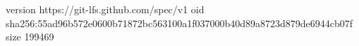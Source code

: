 version https://git-lfs.github.com/spec/v1
oid sha256:55ad96b572e0600b71872bc563100a1f037000b40d89a8723d879de6944cb07f
size 199469
